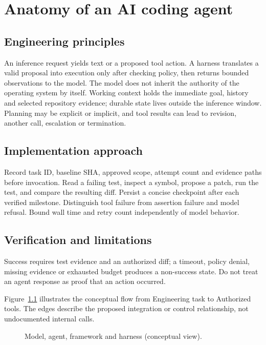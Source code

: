 \chapter{Anatomy of an AI coding agent}

\section{Engineering principles}

An inference request yields text or a proposed tool action. A harness translates a valid proposal into execution only after checking policy, then returns bounded observations to the model. The model does not inherit the authority of the operating system by itself. Working context holds the immediate goal, history and selected repository evidence; durable state lives outside the inference window. Planning may be explicit or implicit, and tool results can lead to revision, another call, escalation or termination.

\section{Implementation approach}

Record task ID, baseline SHA, approved scope, attempt count and evidence paths before invocation. Read a failing test, inspect a symbol, propose a patch, run the test, and compare the resulting diff. Persist a concise checkpoint after each verified milestone. Distinguish tool failure from assertion failure and model refusal. Bound wall time and retry count independently of model behavior.

\section{Verification and limitations}

Success requires test evidence and an authorized diff; a timeout, policy denial, missing evidence or exhausted budget produces a non-success state. Do not treat an agent response as proof that an action occurred.

Figure~\ref{fig:d1} illustrates the conceptual flow from Engineering task to Authorized tools. The edges describe the proposed integration or control relationship, not undocumented internal calls.

\begin{figure}[htbp]\centering\caption{Model, agent, framework and harness (conceptual view).}\label{fig:d1}\end{figure}

